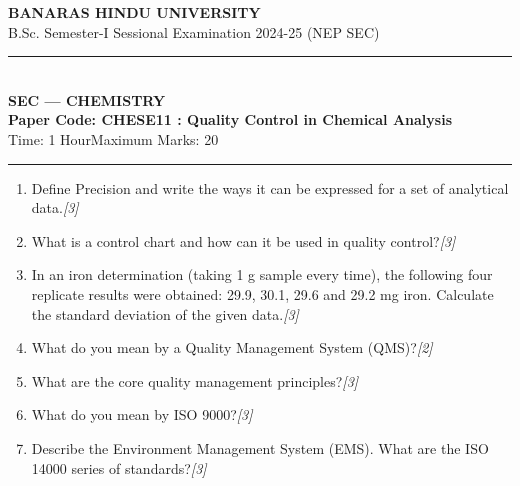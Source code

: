 \documentclass[11pt,a4paper]{article}
\newcommand{\pts}[1]{\hfill   \textit{[#1]}}
\begin{document}
\begin{center}
  {\large\bfseries BANARAS HINDU UNIVERSITY}\\[2pt]
  {\normalsize B.Sc. Semester-I Sessional Examination 2024-25 (NEP SEC)}\\[6pt]
  \rule{0.8\linewidth}{0.5pt}\\[6pt]
  {\large\bfseries SEC --- CHEMISTRY}\\[4pt]
  {\large\bfseries Paper Code: CHESE11 : Quality Control in Chemical Analysis}\\[4pt]
  {\normalsize Time: 1 Hour\hfill Maximum Marks: 20}
\end{center}

\rule{\linewidth}{0.4pt}

\bigskip


\begin{enumerate}[label=   \textbf{Q\arabic*.}]
    \item Define Precision and write the ways it can be expressed for a set of analytical data.\pts{3}
    \item What is a control chart and how can it be used in quality control?\pts{3}
    \item In an iron determination (taking 1 g sample every time), the following four replicate results were obtained: 29.9, 30.1, 29.6 and 29.2 mg iron. Calculate the standard deviation of the given data.\pts{3}
    \item What do you mean by a Quality Management System (QMS)?\pts{2}
    \item What are the core quality management principles?\pts{3}
    \item What do you mean by ISO 9000?\pts{3}
    \item Describe the Environment Management System (EMS). What are the ISO 14000 series of standards?\pts{3}
\end{enumerate}
\end{document}
